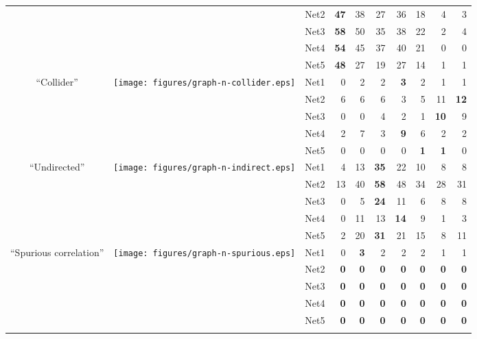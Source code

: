 \begin{table*}[t]
\begin{adjustbox}{max width=\textwidth}
\begin{tabular}{cccrrrrrrr}
  &   & Net2 & \textbf{47} & 38 & 27 & 36 & 18 & 4 & 3 \\
  &   & Net3 & \textbf{58} & 50 & 35 & 38 & 22 & 2 & 4 \\
  &   & Net4 & \textbf{54} & 45 & 37 & 40 & 21 & 0 & 0 \\
  &   & Net5 & \textbf{48} & 27 & 19 & 27 & 14 & 1 & 1 \\
\midrule
\multirow{5}{*}{``Collider''} & \multirow{5}{*}{\texttt{[image: figures/graph-n-collider.eps]}} & Net1 & 0 & 2 & 2 & \textbf{3} & 2 & 1 & 1 \\
  &   & Net2 & 6 & 6 & 6 & 3 & 5 & 11 & \textbf{12} \\
  &   & Net3 & 0 & 0 & 4 & 2 & 1 & \textbf{10} & 9 \\
  &   & Net4 & 2 & 7 & 3 & \textbf{9} & 6 & 2 & 2 \\
  &   & Net5 & 0 & 0 & 0 & 0 & \textbf{1} & \textbf{1} & 0 \\
\midrule
\multirow{5}{*}{``Undirected''} & \multirow{5}{*}{\texttt{[image: figures/graph-n-indirect.eps]}} & Net1 & 4 & 13 & \textbf{35} & 22 & 10 & 8 & 8 \\
  &   & Net2 & 13 & 40 & \textbf{58} & 48 & 34 & 28 & 31 \\
  &   & Net3 & 0 & 5 & \textbf{24} & 11 & 6 & 8 & 8 \\
  &   & Net4 & 0 & 11 & 13 & \textbf{14} & 9 & 1 & 3 \\
  &   & Net5 & 2 & 20 & \textbf{31} & 21 & 15 & 8 & 11 \\
\midrule
\multirow{5}{*}{``Spurious correlation''} & \multirow{5}{*}{\texttt{[image: figures/graph-n-spurious.eps]}} & Net1 & 0 & \textbf{3} & 2 & 2 & 2 & 1 & 1 \\
  &   & Net2 & \textbf{0} & \textbf{0} & \textbf{0} & \textbf{0} & \textbf{0} & \textbf{0} & \textbf{0} \\
  &   & Net3 & \textbf{0} & \textbf{0} & \textbf{0} & \textbf{0} & \textbf{0} & \textbf{0} & \textbf{0} \\
  &   & Net4 & \textbf{0} & \textbf{0} & \textbf{0} & \textbf{0} & \textbf{0} & \textbf{0} & \textbf{0} \\
  &   & Net5 & \textbf{0} & \textbf{0} & \textbf{0} & \textbf{0} & \textbf{0} & \textbf{0} & \textbf{0} \\
\midrule
\botrule
\end{tabular}\end{adjustbox}{}
\end{table*}
